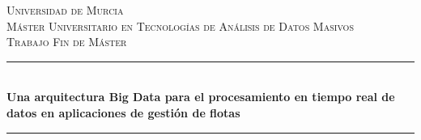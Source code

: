 \documentclass[12pt,twoside,openany]{report}     %
\begin{document}
        \begin{titlepage}

                \newcommand{\HRule}{\rule{\linewidth}{0.5mm}} %

                \center %


                \textsc{\LARGE Universidad de Murcia}\\[1.5cm] %
                \textsc{\Large Máster Universitario en Tecnologías de Análisis de Datos Masivos}\\[0.5cm] %
                \textsc{\large Trabajo Fin de Máster}\\[0.5cm] %


                \HRule \\[0.4cm]
                { \huge \bfseries Una arquitectura Big Data para el procesamiento en tiempo real de datos en aplicaciones de gestión de flotas
                        }\\[0.4cm] %
                \HRule \\[1cm]



\end{titlepage}
\end{document}

